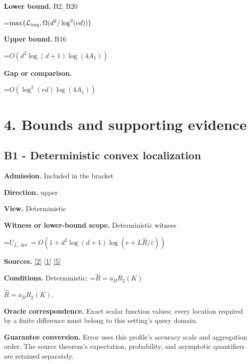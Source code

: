 \documentclass[10pt,a4paper]{article}
\newcommand{\AtlasMath}[1]{\par\begingroup\centering\setbox0=\hbox{$\displaystyle #1$}\ifdim\wd0>1.4\linewidth\typeout{ATLAS WIDE FORMULA: \the\wd0}\fi\ifdim\wd0>\linewidth\resizebox{\linewidth}{!}{\box0}\else\box0\fi\par\endgroup}
\newcommand{\AtlasInlineMath}[1]{\begingroup\setbox0=\hbox{$#1$}\ifdim\wd0>.4\linewidth\endgroup\AtlasMath{#1}\else\endgroup$#1$\fi}
\begin{document}
\textbf{Lower bound.} B2, B20



\AtlasMath{\max\{\mathcal L_{\rm img},\Omega(d^2/\log^2(ed))\}}


\textbf{Upper bound.} B16



\AtlasMath{O(d^2\log(d+1)\log(4A_1))}


\textbf{Gap or comparison.}



\AtlasMath{O(\log^3(ed)\log(4A_1))}


\section{4. Bounds and supporting evidence}


\subsection{B1 - Deterministic convex localization}


\textbf{Admission.} Included in the bracket



\textbf{Direction.} upper



\textbf{View.} Deterministic



\textbf{Witness or lower-bound scope.} Deterministic witness



\AtlasMath{U_{L,\det}=O(1+d^2\log(d+1)\log(e+L\widehat{R}/\varepsilon))}


\textbf{Sources.} \href{https://arxiv.org/html/2607.16558v2}{[2]} \href{https://arxiv.org/html/2610.00345v1}{[1]} \href{https://www.mathnet.ru/php/archive.phtml?jrnid=mzm&option_lang=eng&paperid=1697&wshow=paper}{[5]}



\textbf{Conditions.} Deterministic; \AtlasInlineMath{\widehat{R}=a_BR_2(K)}.



\textbf{Oracle correspondence.} Exact scalar function values; every location required by a finite difference must belong to this setting's query domain.



\textbf{Guarantee conversion.} Error uses this profile's accuracy scale and aggregation order. The source theorem's expectation, probability, and asymptotic quantifiers are retained separately.
\end{document}

